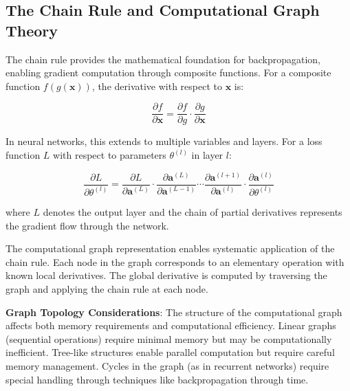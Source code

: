 \documentclass[11pt,a4paper]{report}
\begin{document}
\subsection{The Chain Rule and Computational Graph Theory}

The chain rule provides the mathematical foundation for backpropagation, enabling gradient computation through composite functions. For a composite function $f(g(\mathbf{x}))$, the derivative with respect to $\mathbf{x}$ is:

\begin{equation}
\frac{\partial f}{\partial \mathbf{x}} = \frac{\partial f}{\partial g} \cdot \frac{\partial g}{\partial \mathbf{x}}
\end{equation}

In neural networks, this extends to multiple variables and layers. For a loss function $L$ with respect to parameters $\theta^{(l)}$ in layer $l$:

\begin{equation}
\frac{\partial L}{\partial \theta^{(l)}} = \frac{\partial L}{\partial \mathbf{a}^{(L)}} \cdot \frac{\partial \mathbf{a}^{(L)}}{\partial \mathbf{a}^{(L-1)}} \cdots \frac{\partial \mathbf{a}^{(l+1)}}{\partial \mathbf{a}^{(l)}} \cdot \frac{\partial \mathbf{a}^{(l)}}{\partial \theta^{(l)}}
\end{equation}

where $L$ denotes the output layer and the chain of partial derivatives represents the gradient flow through the network.

The computational graph representation enables systematic application of the chain rule. Each node in the graph corresponds to an elementary operation with known local derivatives. The global derivative is computed by traversing the graph and applying the chain rule at each node.

\textbf{Graph Topology Considerations}: The structure of the computational graph affects both memory requirements and computational efficiency. Linear graphs (sequential operations) require minimal memory but may be computationally inefficient. Tree-like structures enable parallel computation but require careful memory management. Cycles in the graph (as in recurrent networks) require special handling through techniques like backpropagation through time.
\end{document}
